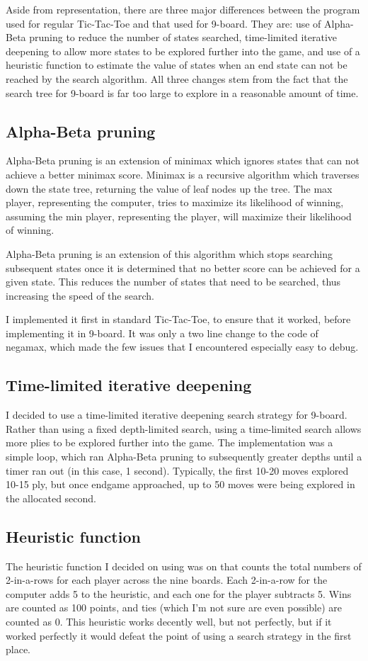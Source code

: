 \documentclass{article}
\begin{document}
Aside from representation, there are three major differences between the program used for regular Tic-Tac-Toe and that used for 9-board. They are: use of Alpha-Beta pruning to reduce the number of states searched, time-limited iterative deepening to allow more states to be explored further into the game, and use of a heuristic function to estimate the value of states when an end state can not be reached by the search algorithm. All three changes stem from the fact that the search tree for 9-board is far too large to explore in a reasonable amount of time.
\subsection{Alpha-Beta pruning}
Alpha-Beta pruning is an extension of minimax which ignores states that can not achieve a better minimax score. Minimax is a recursive algorithm which traverses down the state tree, returning the value of leaf nodes up the tree. The max player, representing the computer, tries to maximize its likelihood of winning, assuming the min player, representing the player, will maximize their likelihood of winning.

Alpha-Beta pruning is an extension of this algorithm which stops searching subsequent states once it is determined that no better score can be achieved for a given state. This reduces the number of states that need to be searched, thus increasing the speed of the search.
 
I implemented it first in standard Tic-Tac-Toe, to ensure that it worked, before implementing it in 9-board. It was only a two line change to the code of negamax, which made the few issues that I encountered especially easy to debug.
\subsection{Time-limited iterative deepening}
I decided to use a time-limited iterative deepening search strategy for 9-board. Rather than using a fixed depth-limited search, using a time-limited search allows more plies to be explored further into the game. The implementation was a simple loop, which ran Alpha-Beta pruning to subsequently greater depths until a timer ran out (in this case, 1 second). Typically, the first 10-20 moves explored 10-15 ply, but once endgame approached, up to 50 moves were being explored in the allocated second.
\subsection{Heuristic function}
The heuristic function I decided on using was on that counts the total numbers of 2-in-a-rows for each player across the nine boards. Each 2-in-a-row for the computer adds 5 to the heuristic, and each one for the player subtracts 5. Wins are counted as 100 points, and ties (which I'm not sure are even possible) are counted as 0. This heuristic works decently well, but not perfectly, but if it worked perfectly it would defeat the point of using a search strategy in the first place.
\end{document}
